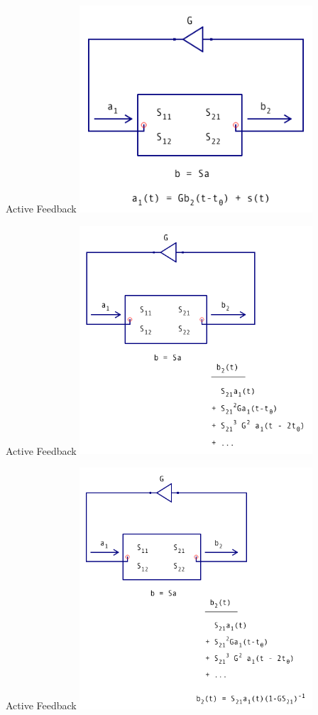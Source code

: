 \documentclass{beamer}
\begin{document}
\begin{frame}{Active Feedback}
\centering
\includegraphics[width=0.65\textwidth]{export_sparams_7}
\end{frame}

\begin{frame}{Active Feedback}
\centering
\includegraphics[width=0.65\textwidth]{export_sparams_8}
\end{frame}

\begin{frame}{Active Feedback}
\centering
\includegraphics[width=0.65\textwidth]{export_sparams_9}
\end{frame}
\end{document}
